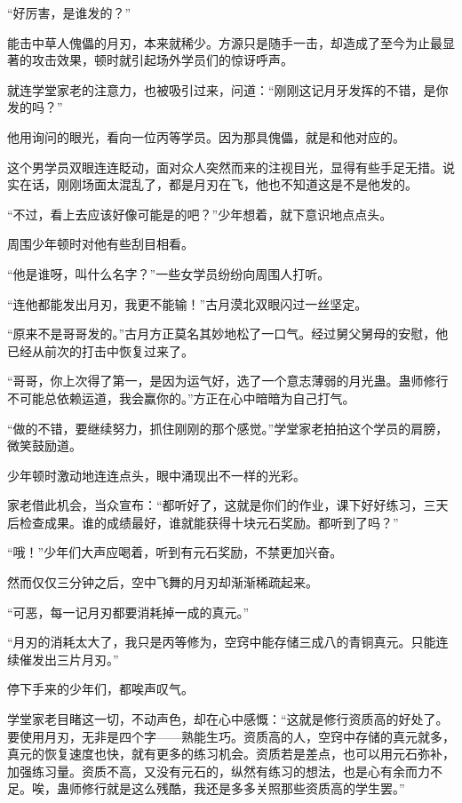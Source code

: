 \begin{this_body}
“好厉害，是谁发的？”

能击中草人傀儡的月刃，本来就稀少。方源只是随手一击，却造成了至今为止最显著的攻击效果，顿时就引起场外学员们的惊讶呼声。

就连学堂家老的注意力，也被吸引过来，问道：“刚刚这记月牙发挥的不错，是你发的吗？”

他用询问的眼光，看向一位丙等学员。因为那具傀儡，就是和他对应的。

这个男学员双眼连连眨动，面对众人突然而来的注视目光，显得有些手足无措。说实在话，刚刚场面太混乱了，都是月刃在飞，他也不知道这是不是他发的。

“不过，看上去应该好像可能是的吧？”少年想着，就下意识地点点头。

周围少年顿时对他有些刮目相看。

“他是谁呀，叫什么名字？”一些女学员纷纷向周围人打听。

“连他都能发出月刃，我更不能输！”古月漠北双眼闪过一丝坚定。

“原来不是哥哥发的。”古月方正莫名其妙地松了一口气。经过舅父舅母的安慰，他已经从前次的打击中恢复过来了。

“哥哥，你上次得了第一，是因为运气好，选了一个意志薄弱的月光蛊。蛊师修行不可能总依赖运道，我会赢你的。”方正在心中暗暗为自己打气。

“做的不错，要继续努力，抓住刚刚的那个感觉。”学堂家老拍拍这个学员的肩膀，微笑鼓励道。

少年顿时激动地连连点头，眼中涌现出不一样的光彩。

家老借此机会，当众宣布：“都听好了，这就是你们的作业，课下好好练习，三天后检查成果。谁的成绩最好，谁就能获得十块元石奖励。都听到了吗？”

“哦！”少年们大声应喝着，听到有元石奖励，不禁更加兴奋。

然而仅仅三分钟之后，空中飞舞的月刃却渐渐稀疏起来。

“可恶，每一记月刃都要消耗掉一成的真元。”

“月刃的消耗太大了，我只是丙等修为，空窍中能存储三成八的青铜真元。只能连续催发出三片月刃。”

停下手来的少年们，都唉声叹气。

学堂家老目睹这一切，不动声色，却在心中感慨：“这就是修行资质高的好处了。要使用月刃，无非是四个字——熟能生巧。资质高的人，空窍中存储的真元就多，真元的恢复速度也快，就有更多的练习机会。资质若是差点，也可以用元石弥补，加强练习量。资质不高，又没有元石的，纵然有练习的想法，也是心有余而力不足。唉，蛊师修行就是这么残酷，我还是多多关照那些资质高的学生罢。”

\end{this_body}

